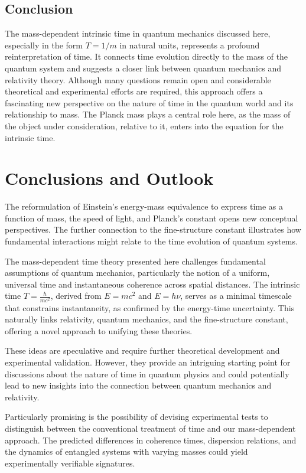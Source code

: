\documentclass{article}
\begin{document}
	\subsection{Conclusion}
	
	The mass-dependent intrinsic time in quantum mechanics discussed here, especially in the form $T = 1/m$ in natural units, represents a profound reinterpretation of time. It connects time evolution directly to the mass of the quantum system and suggests a closer link between quantum mechanics and relativity theory. Although many questions remain open and considerable theoretical and experimental efforts are required, this approach offers a fascinating new perspective on the nature of time in the quantum world and its relationship to mass. The Planck mass plays a central role here, as the mass of the object under consideration, relative to it, enters into the equation for the intrinsic time.
	
	\section{Conclusions and Outlook}
	
	The reformulation of Einstein's energy-mass equivalence to express time as a function of mass, the speed of light, and Planck's constant opens new conceptual perspectives. The further connection to the fine-structure constant illustrates how fundamental interactions might relate to the time evolution of quantum systems.
	
	The mass-dependent time theory presented here challenges fundamental assumptions of quantum mechanics, particularly the notion of a uniform, universal time and instantaneous coherence across spatial distances. The intrinsic time $T = \frac{\hbar}{mc^2}$, derived from $E = mc^2$ and $E = h\nu$, serves as a minimal timescale that constrains instantaneity, as confirmed by the energy-time uncertainty. This naturally links relativity, quantum mechanics, and the fine-structure constant, offering a novel approach to unifying these theories.
	
	These ideas are speculative and require further theoretical development and experimental validation. However, they provide an intriguing starting point for discussions about the nature of time in quantum physics and could potentially lead to new insights into the connection between quantum mechanics and relativity.
	
	Particularly promising is the possibility of devising experimental tests to distinguish between the conventional treatment of time and our mass-dependent approach. The predicted differences in coherence times, dispersion relations, and the dynamics of entangled systems with varying masses could yield experimentally verifiable signatures.
\appendix
\end{document}
